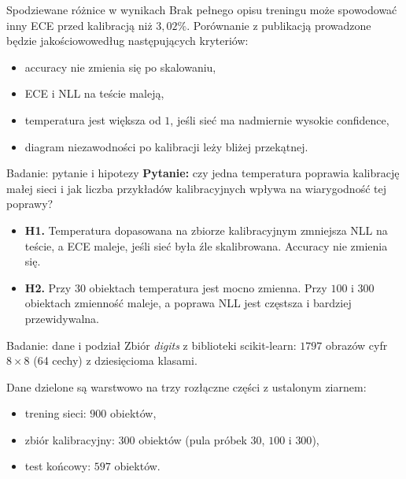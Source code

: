 \documentclass[aspectratio=169,professionalfonts,t]{beamer}
\begin{document}
\begin{frame}{Spodziewane różnice w wynikach}
  Brak pełnego opisu treningu może spowodować inny ECE przed kalibracją niż $3{,}02\%$.
  Porównanie z publikacją prowadzone będzie jakościowowedług następujących kryteriów:
  \begin{itemize}
    \item accuracy nie zmienia się po skalowaniu,
    \item ECE i NLL na teście maleją,
    \item temperatura jest większa od $1$, jeśli sieć ma nadmiernie wysokie confidence,
    \item diagram niezawodności po kalibracji leży bliżej przekątnej.
  \end{itemize}
\end{frame}

\begin{frame}{Badanie: pytanie i hipotezy}
  \textbf{Pytanie:} czy jedna temperatura poprawia kalibrację małej sieci i jak liczba przykładów kalibracyjnych wpływa na wiarygodność tej poprawy?
  \vspace{0.5em}
  \begin{itemize}
    \item \textbf{H1.} Temperatura dopasowana na zbiorze kalibracyjnym zmniejsza NLL na teście, a ECE maleje, jeśli sieć była źle skalibrowana. Accuracy nie zmienia się.
    \item \textbf{H2.} Przy $30$ obiektach temperatura jest mocno zmienna. Przy $100$ i $300$ obiektach zmienność maleje, a poprawa NLL jest częstsza i bardziej przewidywalna.
  \end{itemize}
\end{frame}

\begin{frame}{Badanie: dane i podział}
  Zbiór \emph{digits} z biblioteki scikit-learn: $1797$ obrazów cyfr $8\times8$ (64 cechy) z dziesięcioma klasami.
  
  \vspace{0.5em}
  Dane dzielone są warstwowo na trzy rozłączne części z ustalonym ziarnem:
  \begin{itemize}
    \item trening sieci: $900$ obiektów,
    \item zbiór kalibracyjny: $300$ obiektów (pula próbek $30$, $100$ i $300$),
    \item test końcowy: $597$ obiektów.
  \end{itemize}
\end{frame}
\end{document}
